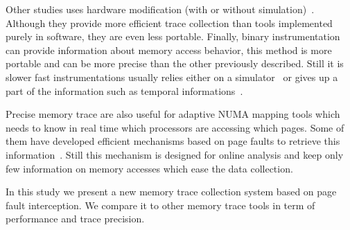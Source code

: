 
Other studies uses hardware modification (with or without
simulation)~\cite{Bao08HMTT,Martonosi92MemSpy}.  Although they provide more
efficient trace collection than tools implemented purely in software, they are
even less portable.
Finally, binary instrumentation can provide information about memory access
behavior, this method is more portable and can be more
precise than the other previously described. Still it is slower fast
instrumentations usually relies either on a simulator~\cite{DeRose02SIGMA} or
gives up a part of the information such as temporal
informations~\cite{Beniamine15Tabarnac}.

Precise memory trace are also useful for adaptive NUMA mapping tools which
needs to know in real time which processors are accessing which pages. Some of
them have developed efficient mechanisms based on page faults to retrieve this
information~\cite{Diener13CommunicationBased}. Still this mechanism is
designed for online analysis and keep only few information on memory accesses
which ease the data collection.

In this study we present a new memory trace collection system based on page
fault interception. We compare it to other memory trace tools in term of
performance and trace precision.
